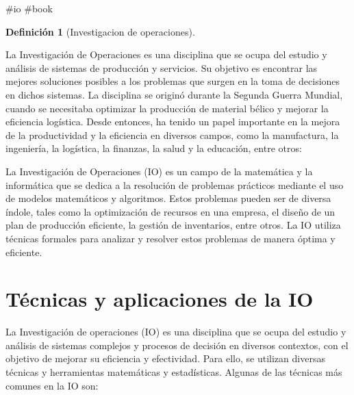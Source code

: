 \documentclass[
  letterpaper,
  DIV=11,
  numbers=noendperiod]{scrreprt}
\theoremstyle{definition}
\theoremstyle{definition}
\newtheorem{definition}{Definición}[chapter]
\theoremstyle{remark}
\begin{document}
\#io \#book

\begin{definition}[Investigacion de
operaciones]\protect\hypertarget{def-io}{}\label{def-io}

La Investigación de Operaciones es una disciplina que se ocupa del
estudio y análisis de sistemas de producción y servicios. Su objetivo es
encontrar las mejores soluciones posibles a los problemas que surgen en
la toma de decisiones en dichos sistemas. La disciplina se originó
durante la Segunda Guerra Mundial, cuando se necesitaba optimizar la
producción de material bélico y mejorar la eficiencia logística. Desde
entonces, ha tenido un papel importante en la mejora de la productividad
y la eficiencia en diversos campos, como la manufactura, la ingeniería,
la logística, la finanzas, la salud y la educación, entre otros:

\end{definition}

La Investigación de Operaciones (IO) es un campo de la matemática y la
informática que se dedica a la resolución de problemas prácticos
mediante el uso de modelos matemáticos y algoritmos. Estos problemas
pueden ser de diversa índole, tales como la optimización de recursos en
una empresa, el diseño de un plan de producción eficiente, la gestión de
inventarios, entre otros. La IO utiliza técnicas formales para analizar
y resolver estos problemas de manera óptima y eficiente.

\hypertarget{tuxe9cnicas-y-aplicaciones-de-la-io}{%
\section{Técnicas y aplicaciones de la
IO}\label{tuxe9cnicas-y-aplicaciones-de-la-io}}

La Investigación de operaciones (IO) es una disciplina que se ocupa del
estudio y análisis de sistemas complejos y procesos de decisión en
diversos contextos, con el objetivo de mejorar su eficiencia y
efectividad. Para ello, se utilizan diversas técnicas y herramientas
matemáticas y estadísticas. Algunas de las técnicas más comunes en la IO
son:
\end{document}
